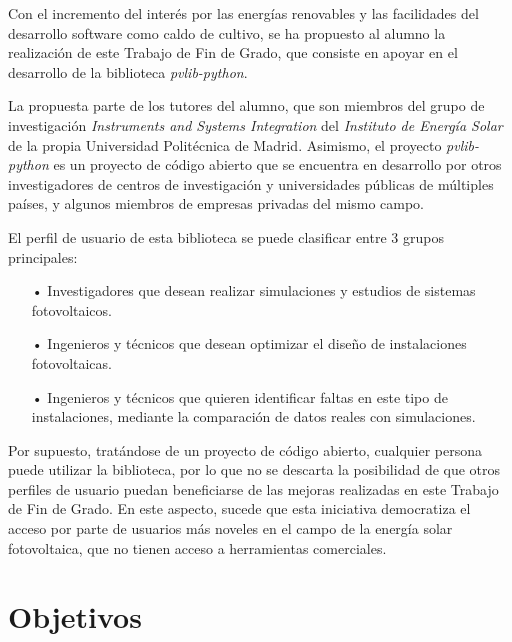 Con el incremento del interés por las energías renovables y las facilidades del desarrollo software como caldo de cultivo, se ha propuesto al alumno la realización de este Trabajo de Fin de Grado, que consiste en apoyar en el desarrollo de la biblioteca \textit{pvlib-python}.

La propuesta parte de los tutores del alumno, que son miembros del grupo de investigación \textit{Instruments and Systems Integration} del \textit{Instituto de Energía Solar} de la propia Universidad Politécnica de Madrid. Asimismo, el proyecto \textit{pvlib-python} es un proyecto de código abierto que se encuentra en desarrollo por otros investigadores de centros de investigación y universidades públicas de múltiples países, y algunos miembros de empresas privadas del mismo campo.

El perfil de usuario de esta biblioteca se puede clasificar entre 3 grupos principales:

\begin{itemize}

    \item[•] Investigadores que desean realizar simulaciones y estudios de sistemas fotovoltaicos.

    \item[•] Ingenieros y técnicos que desean optimizar el diseño de instalaciones fotovoltaicas.

    \item[•] Ingenieros y técnicos que quieren identificar faltas en este tipo de instalaciones, mediante la comparación de datos reales con simulaciones.

\end{itemize}

Por supuesto, tratándose de un proyecto de código abierto, cualquier persona puede utilizar la biblioteca, por lo que no se descarta la posibilidad de que otros perfiles de usuario puedan beneficiarse de las mejoras realizadas en este Trabajo de Fin de Grado. En este aspecto, sucede que esta iniciativa democratiza el acceso por parte de usuarios más noveles en el campo de la energía solar fotovoltaica, que no tienen acceso a herramientas comerciales.


\section{Objetivos} \label{sct:intro:objetivos}

